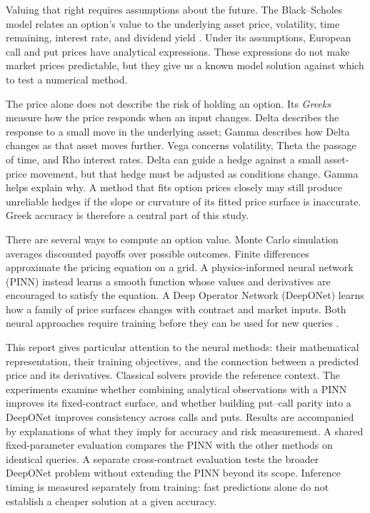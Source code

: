 \documentclass[11pt,a4paper]{article}
\begin{document}
Valuing that right requires assumptions about the future. The Black--Scholes model relates an option's value to the underlying asset price, volatility, time remaining, interest rate, and dividend yield \cite{black1973,merton1973}. Under its assumptions, European call and put prices have analytical expressions. These expressions do not make market prices predictable, but they give us a known model solution against which to test a numerical method.

The price alone does not describe the risk of holding an option. Its \emph{Greeks} measure how the price responds when an input changes. Delta describes the response to a small move in the underlying asset; Gamma describes how Delta changes as that asset moves further. Vega concerns volatility, Theta the passage of time, and Rho interest rates. Delta can guide a hedge against a small asset-price movement, but that hedge must be adjusted as conditions change. Gamma helps explain why. A method that fits option prices closely may still produce unreliable hedges if the slope or curvature of its fitted price surface is inaccurate. Greek accuracy is therefore a central part of this study.

There are several ways to compute an option value. Monte Carlo simulation averages discounted payoffs over possible outcomes. Finite differences approximate the pricing equation on a grid. A physics-informed neural network (PINN) instead learns a smooth function whose values and derivatives are encouraged to satisfy the equation. A Deep Operator Network (DeepONet) learns how a family of price surfaces changes with contract and market inputs. Both neural approaches require training before they can be used for new queries \cite{raissi2019,lu2021}.

This report gives particular attention to the neural methods: their mathematical representation, their training objectives, and the connection between a predicted price and its derivatives. Classical solvers provide the reference context. The experiments examine whether combining analytical observations with a PINN improves its fixed-contract surface, and whether building put--call parity into a DeepONet improves consistency across calls and puts. Results are accompanied by explanations of what they imply for accuracy and risk measurement. A shared fixed-parameter evaluation compares the PINN with the other methods on identical queries. A separate cross-contract evaluation tests the broader DeepONet problem without extending the PINN beyond its scope. Inference timing is measured separately from training: fast predictions alone do not establish a cheaper solution at a given accuracy.
\end{document}

